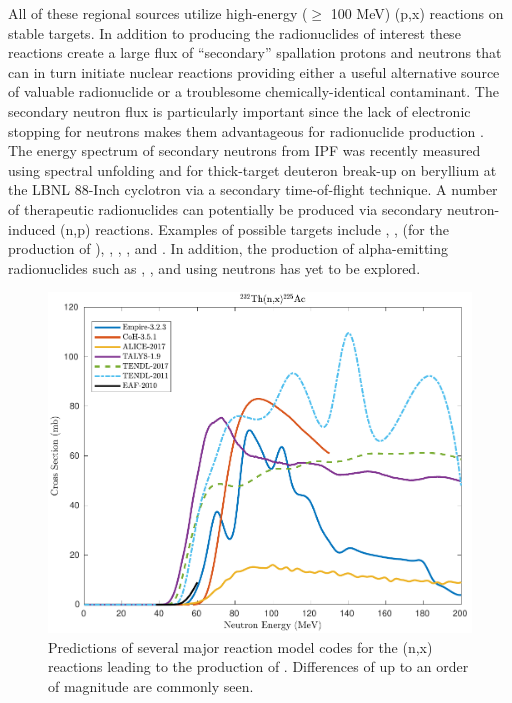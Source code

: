 \documentclass[letterpaper]{ar-1col}
\begin{document}
All of these regional sources utilize high-energy ($\geq$ 100 MeV) (p,x) reactions on stable targets.
 In addition to producing the radionuclides of interest these reactions create a large flux of \enquote{secondary} spallation protons and neutrons that can in turn initiate nuclear reactions providing either a useful alternative source of valuable radionuclide or a troublesome chemically-identical contaminant.
 The secondary neutron flux is particularly important since the lack of electronic stopping for neutrons makes them advantageous for radionuclide production \cite{Voyles2017}.
 The energy spectrum of secondary neutrons from IPF was recently measured using spectral unfolding \cite{Mos16} and for thick-target deuteron break-up on beryllium at the LBNL 88-Inch cyclotron \cite{Harrig2018} via a secondary time-of-flight technique.
A number of therapeutic radionuclides can potentially be produced via secondary neutron-induced (n,p) reactions.
Examples of possible targets include , ,  (for the production of ), , , , and .
 In addition, the production of alpha-emitting radionuclides such as , , and  using neutrons has yet to be explored.


\begin{figure}
 \centering
 \includegraphics[width=0.7\linewidth]{225Ac.pdf}

 \caption{Predictions of several major reaction model codes for the (n,x) reactions leading to the production of .  Differences of up to an order of magnitude are commonly seen.    }
 \label{fig:ithemba_plot}
\end{figure}
\end{document}
